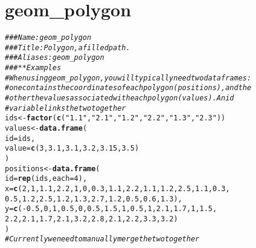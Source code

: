 \documentclass[a4paper,titlepage]{tufte-handout}\usepackage[]{graphicx}\usepackage[]{color}
\makeatletter
\newcommand{\hlnum}[1]{\textcolor[rgb]{0.686,0.059,0.569}{#1}}%
\newcommand{\hlstr}[1]{\textcolor[rgb]{0.192,0.494,0.8}{#1}}%
\newcommand{\hlcom}[1]{\textcolor[rgb]{0.678,0.584,0.686}{\textit{#1}}}%
\newcommand{\hlopt}[1]{\textcolor[rgb]{0,0,0}{#1}}%
\newcommand{\hlstd}[1]{\textcolor[rgb]{0.345,0.345,0.345}{#1}}%
\newcommand{\hlkwb}[1]{\textcolor[rgb]{0.69,0.353,0.396}{#1}}%
\newcommand{\hlkwc}[1]{\textcolor[rgb]{0.333,0.667,0.333}{#1}}%
\newcommand{\hlkwd}[1]{\textcolor[rgb]{0.737,0.353,0.396}{\textbf{#1}}}%
\newenvironment{kframe}{%
 \def\at@end@of@kframe{}%
 \ifinner\ifhmode%
  \def\at@end@of@kframe{\end{minipage}}%
  \begin{minipage}{\columnwidth}%
 \fi\fi%
 \def\FrameCommand##1{\hskip\@totalleftmargin \hskip-\fboxsep
 \colorbox{shadecolor}{##1}\hskip-\fboxsep
     \hskip-\linewidth \hskip-\@totalleftmargin \hskip\columnwidth}%
 \MakeFramed {\advance\hsize-\width
   \@totalleftmargin\z@ \linewidth\hsize
   \@setminipage}}%
 {\par\unskip\endMakeFramed%
 \at@end@of@kframe}
\newenvironment{knitrout}{}{} %
\makeatother
\begin{document}
\section{geom\_polygon}

\begin{knitrout}
\color{fgcolor}\begin{kframe}
\begin{alltt}
\hlcom{### Name: geom_polygon}
\hlcom{### Title: Polygon, a filled path.}
\hlcom{### Aliases: geom_polygon}
\hlcom{### ** Examples}
\hlcom{# When using geom_polygon, you will typically need two data frames:}
\hlcom{# one contains the coordinates of each polygon (positions),  and the}
\hlcom{# other the values associated with each polygon (values).  An id}
\hlcom{# variable links the two together}
\hlstd{ids} \hlkwb{<-} \hlkwd{factor}\hlstd{(}\hlkwd{c}\hlstd{(}\hlstr{"1.1"}\hlstd{,} \hlstr{"2.1"}\hlstd{,} \hlstr{"1.2"}\hlstd{,} \hlstr{"2.2"}\hlstd{,} \hlstr{"1.3"}\hlstd{,} \hlstr{"2.3"}\hlstd{))}
\hlstd{values} \hlkwb{<-} \hlkwd{data.frame}\hlstd{(}
  \hlkwc{id} \hlstd{= ids,}
  \hlkwc{value} \hlstd{=} \hlkwd{c}\hlstd{(}\hlnum{3}\hlstd{,} \hlnum{3.1}\hlstd{,} \hlnum{3.1}\hlstd{,} \hlnum{3.2}\hlstd{,} \hlnum{3.15}\hlstd{,} \hlnum{3.5}\hlstd{)}
\hlstd{)}
\hlstd{positions} \hlkwb{<-} \hlkwd{data.frame}\hlstd{(}
  \hlkwc{id} \hlstd{=} \hlkwd{rep}\hlstd{(ids,} \hlkwc{each} \hlstd{=} \hlnum{4}\hlstd{),}
  \hlkwc{x} \hlstd{=} \hlkwd{c}\hlstd{(}\hlnum{2}\hlstd{,} \hlnum{1}\hlstd{,} \hlnum{1.1}\hlstd{,} \hlnum{2.2}\hlstd{,} \hlnum{1}\hlstd{,} \hlnum{0}\hlstd{,} \hlnum{0.3}\hlstd{,} \hlnum{1.1}\hlstd{,} \hlnum{2.2}\hlstd{,} \hlnum{1.1}\hlstd{,} \hlnum{1.2}\hlstd{,} \hlnum{2.5}\hlstd{,} \hlnum{1.1}\hlstd{,} \hlnum{0.3}\hlstd{,}
  \hlnum{0.5}\hlstd{,} \hlnum{1.2}\hlstd{,} \hlnum{2.5}\hlstd{,} \hlnum{1.2}\hlstd{,} \hlnum{1.3}\hlstd{,} \hlnum{2.7}\hlstd{,} \hlnum{1.2}\hlstd{,} \hlnum{0.5}\hlstd{,} \hlnum{0.6}\hlstd{,} \hlnum{1.3}\hlstd{),}
  \hlkwc{y} \hlstd{=} \hlkwd{c}\hlstd{(}\hlopt{-}\hlnum{0.5}\hlstd{,} \hlnum{0}\hlstd{,} \hlnum{1}\hlstd{,} \hlnum{0.5}\hlstd{,} \hlnum{0}\hlstd{,} \hlnum{0.5}\hlstd{,} \hlnum{1.5}\hlstd{,} \hlnum{1}\hlstd{,} \hlnum{0.5}\hlstd{,} \hlnum{1}\hlstd{,} \hlnum{2.1}\hlstd{,} \hlnum{1.7}\hlstd{,} \hlnum{1}\hlstd{,} \hlnum{1.5}\hlstd{,}
  \hlnum{2.2}\hlstd{,} \hlnum{2.1}\hlstd{,} \hlnum{1.7}\hlstd{,} \hlnum{2.1}\hlstd{,} \hlnum{3.2}\hlstd{,} \hlnum{2.8}\hlstd{,} \hlnum{2.1}\hlstd{,} \hlnum{2.2}\hlstd{,} \hlnum{3.3}\hlstd{,} \hlnum{3.2}\hlstd{)}
\hlstd{)}
\hlcom{# Currently we need to manually merge the two together}

\end{alltt}
\end{kframe}
\end{knitrout}
\end{document}
